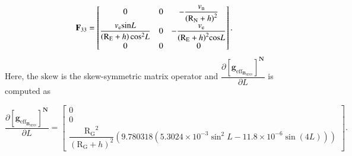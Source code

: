 \documentclass[3p]{elsarticle}
\begin{document}
%
\begin{equation}\label{F33}
	{{\mathbf{F}}_{33}} = \begin{bmatrix}
		0 & 0 & { - \dfrac{{{{ v}_{\rm{n}}}}}{{{{\left( {{{\rm{R}}_{\rm{N}}} +  h} \right)}^2}}}} \\
		{\dfrac{{{{ v}_{\rm{e}}}{\sin} L}}{{\left( {{{\rm{R}}_{\rm{E}}} +  h} \right){\rm{co}}{{\rm{s}}^2} L}}} & 0 & { - \dfrac{{{{ v}_{\rm{e}}}}}{{{{\left( {{{\rm{R}}_{\rm{E}}} +  h} \right)}^2}{\cos} L}}} \\
		0 & 0 & 0
	\end{bmatrix}.
\end{equation}
Here, the \(\textrm{skew}\) is the skew-symmetric matrix operator and \(
\dfrac{\partial {\left[\mathbf{g}_{\mathrm{eff}_{\mathbf{B}_{\text{SINS}}}}\right]}^{\mathbf{N}}}{\partial L}
\)
is  computed as

    \begin{equation}
        \dfrac{\partial {\left[\mathbf{g}_{\mathrm{eff}_{\mathbf{B}_{\text{SINS}}}}\right]}^{\mathbf{N}}}{\partial L} =
        \begin{bmatrix}
            0 \\
            0 \\
            \dfrac{\mathrm{R_G}^2}{(\mathrm{R_G}+h)^2} \left(
                9.780318(5.3024 \times 10^{-3} \sin^2 L - 11.8 \times 10^{-6} \sin(4L))
            \right)
        \end{bmatrix}.
    \end{equation}
\end{document}
